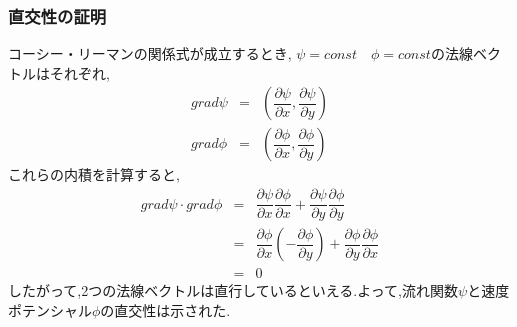 \documentclass[a4paper]{jsarticle}
\begin{document}
\subsubsection{直交性の証明}
コーシー・リーマンの関係式が成立するとき,
$\psi=const\quad \phi=const$の法線ベクトルはそれぞれ,
\begin{eqnarray*}
    grad \psi&=&\left(\dfrac{\partial \psi}{\partial x}, \dfrac{\partial \psi}{\partial y}\right)\\
    grad \phi&=&\left(\dfrac{\partial \phi}{\partial x}, \dfrac{\partial \phi}{\partial y}\right)
\end{eqnarray*}
これらの内積を計算すると,
\begin{eqnarray*}
    grad\psi \cdot grad\phi &=& \dfrac{\partial \psi}{\partial x}\dfrac{\partial \phi}{\partial x} +\dfrac{\partial \psi}{\partial y}\dfrac{\partial \phi}{\partial y}\\
    &=&\dfrac{\partial \phi}{\partial x}\left(-\dfrac{\partial \phi}{\partial y}\right)+\dfrac{\partial \phi}{\partial y}\dfrac{\partial \phi}{\partial x}\\
    &=&0
\end{eqnarray*}
したがって,2つの法線ベクトルは直行しているといえる.よって,流れ関数$\psi$と速度ポテンシャル$\phi$の直交性は示された.
\end{document}
